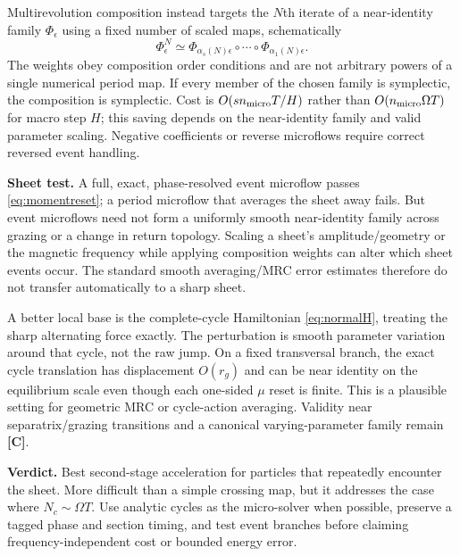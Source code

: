 \documentclass[10pt,a4paper]{article}
\newcommand{\conj}{\textbf{[C]}}
\begin{document}
Multirevolution composition instead targets the $N$th iterate of a near-identity family $\Phi_\epsilon$ using a fixed number of scaled maps, schematically
\begin{equation}\label{eq:mrc}
 \Phi_\epsilon^N\simeq
 \Phi_{\alpha_s(N)\epsilon}\circ\cdots\circ\Phi_{\alpha_1(N)\epsilon}.
\end{equation}
The weights obey composition order conditions and are not arbitrary powers of a single numerical period map. If every member of the chosen family is symplectic, the composition is symplectic. Cost is $O(s n_{\rm micro}T/H)$ rather than $O(n_{\rm micro}\Omega T)$ for macro step $H$; this saving depends on the near-identity family and valid parameter scaling. Negative coefficients or reverse microflows require correct reversed event handling.

\textbf{Sheet test.} A full, exact, phase-resolved event microflow passes \eqref{eq:momentreset}; a period microflow that averages the sheet away fails. But event microflows need not form a uniformly smooth near-identity family across grazing or a change in return topology. Scaling a sheet's amplitude/geometry or the magnetic frequency while applying composition weights can alter which sheet events occur. The standard smooth averaging/MRC error estimates therefore do not transfer automatically to a sharp sheet.

A better local base is the complete-cycle Hamiltonian \eqref{eq:normalH}, treating the sharp alternating force exactly. The perturbation is smooth parameter variation around that cycle, not the raw jump. On a fixed transversal branch, the exact cycle translation has displacement $O(r_g)$ and can be near identity on the equilibrium scale even though each one-sided $\mu$ reset is finite. This is a plausible setting for geometric MRC or cycle-action averaging. Validity near separatrix/grazing transitions and a canonical varying-parameter family remain \conj{}.

\textbf{Verdict.} Best second-stage acceleration for particles that repeatedly encounter the sheet. More difficult than a simple crossing map, but it addresses the case where $N_c\sim\Omega T$. Use analytic cycles as the micro-solver when possible, preserve a tagged phase and section timing, and test event branches before claiming frequency-independent cost or bounded energy error.
\end{document}
